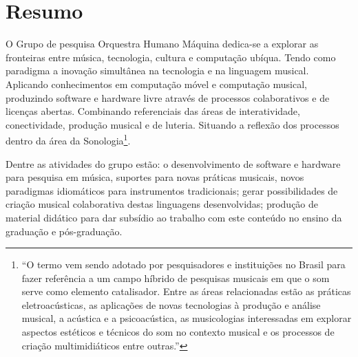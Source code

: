 \documentclass[
	12pt,				%
	openright,			%
	twoside,			%
	a4paper,			%
	english,			%
	french,				%
	spanish,			%
	brazil,				%
	]{abntex2}
\begin{document}

\frenchspacing 



\imprimirfolhaderosto



\tableofcontents*
\cleardoublepage


\textual

\chapter*[Resumo]{Resumo}

O Grupo de pesquisa Orquestra Humano Máquina dedica-se a explorar as fronteiras entre música, tecnologia, cultura e computação ubíqua. Tendo como paradigma a inovação simultânea na tecnologia e na linguagem musical. Aplicando conhecimentos em computação móvel e computação musical, produzindo software e hardware livre através de processos colaborativos e de licenças abertas. Combinando referenciais das áreas de interatividade, conectividade, produção musical e de luteria. Situando a reflexão dos processos dentro da área da Sonologia\footnote{“O termo vem sendo adotado por pesquisadores e instituições no Brasil para fazer referência a um campo híbrido de pesquisas musicais em que o som serve como elemento catalisador. Entre as áreas relacionadas estão as práticas eletroacústicas, as aplicações de novas tecnologias à produção e análise musical, a acústica e a psicoacústica, as musicologias interessadas em explorar aspectos estéticos e técnicos do som no contexto musical e os processos de criação multimidiáticos entre outras.”}. 

Dentre as atividades do grupo estão: o desenvolvimento de software e hardware para pesquisa em música, suportes para novas práticas musicais, novos paradigmas idiomáticos para instrumentos tradicionais; gerar possibilidades de criação musical colaborativa destas linguagens desenvolvidas; produção de material didático para dar subsídio ao trabalho com este conteúdo no ensino da graduação e pós-graduação.
\end{document}
